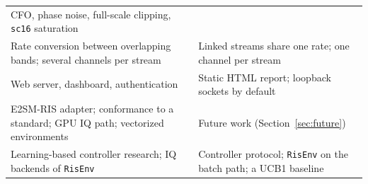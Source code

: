 \begin{table}[t]
\begin{tabular}{@{}>{\raggedright\arraybackslash}p{1.52in}>{\raggedright\arraybackslash}p{1.86in}@{}}
  CFO, phase noise, full-scale clipping, \texttt{sc16} saturation \\
Rate conversion between overlapping bands; several channels per stream &
  Linked streams share one rate; one channel per stream \\
Web server, dashboard, authentication &
  Static HTML report; loopback sockets by default \\
E2SM-RIS adapter; conformance to a standard; GPU IQ path; vectorized environments &
  Future work (Section~\ref{sec:future}) \\
Learning-based controller research; IQ backends of \texttt{RisEnv} &
  Controller protocol; \texttt{RisEnv} on the batch path; a UCB1 baseline \\
\bottomrule
\end{tabular}
\end{table}
